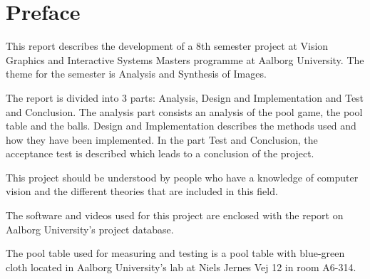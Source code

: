 \chapter*{Preface}
This report describes the development of a 8th semester project at Vision Graphics and Interactive Systems Masters programme at Aalborg University. The theme for the semester is Analysis and Synthesis of Images. 

The report is divided into 3 parts: Analysis, Design and Implementation and Test and Conclusion. The analysis part consists an analysis of the pool game, the pool table and the balls. Design and Implementation describes the methods used and how they have been implemented. In the part Test and Conclusion, the acceptance test is described which leads to a conclusion of the project.

This project should be understood by people who have a knowledge of computer vision and the different theories that are included in this field.

The software and videos used for this project are enclosed with the report on Aalborg University's project database.

The pool table used for measuring and testing is a pool table with blue-green cloth located in Aalborg University's lab at Niels Jernes Vej 12 in room A6-314.